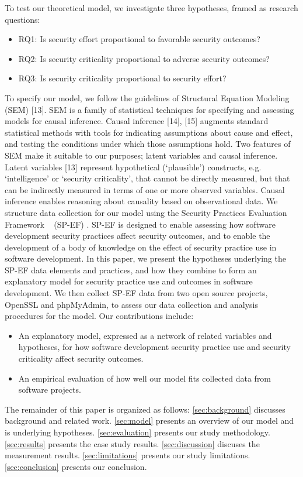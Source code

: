 To test our theoretical model, we investigate three hypotheses, framed as research questions:
\begin{itemize}
\item RQ1: Is security effort proportional to favorable security outcomes?
\item RQ2: Is security criticality proportional to adverse security outcomes?
\item RQ3: Is security criticality proportional to security effort?
\end{itemize}

To specify our model, we follow the guidelines of Structural Equation Modeling (SEM) [13]. SEM is a family of statistical techniques for specifying and assessing models for causal inference. Causal inference [14], [15] augments standard statistical methods with tools for indicating assumptions about cause and effect, and testing the conditions under which those assumptions hold. Two features of SEM make it suitable to our purposes; latent variables and causal inference. Latent variables [13] represent hypothetical (‘plausible’) constructs, e.g. ‘intelligence’ or ‘security criticality’, that cannot be directly measured, but that can be indirectly measured in terms of one or more observed variables. Causal inference enables reasoning about causality based on observational data.  
We structure data collection for our model using the Security Practices Evaluation Framework ~\cite{morrison2016spefsite} (SP-EF) . SP-EF is designed to enable assessing how software development security practices affect security outcomes, and to enable the development of a body of knowledge on the effect of security practice use in software development.
In this paper, we present the hypotheses underlying the SP-EF data elements and practices, and how they combine to form an explanatory model for security practice use and outcomes in software development. We then collect SP-EF data from two open source projects, OpenSSL and phpMyAdmin, to assess our data collection and analysis procedures for the model. 
Our contributions include:
\begin{itemize}
\item An explanatory model, expressed as a network of related variables and hypotheses, for how software development security practice use and security criticality affect security outcomes.
\item An empirical evaluation of how well our model fits collected data from software projects. 
\end{itemize}
The remainder of this paper is organized as follows:  \ref{sec:background} discusses background and related work. \ref{sec:model} presents an overview of our model and is underlying hypotheses. \ref{sec:evaluation} presents our study methodology. \ref{sec:results} presents the case study results. \ref{sec:discussion} discuses the measurement results. \ref{sec:limitations} presents our study limitations. \ref{sec:conclusion} presents our conclusion.

